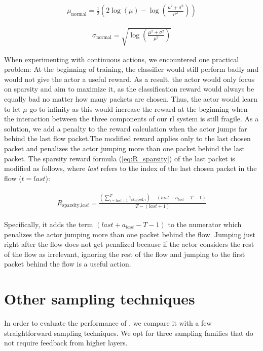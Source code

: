 \documentclass[conference]{IEEEtran}
\begin{document}
\begin{align}
\mu_{\text{normal}} = \frac{1}{2}\left( 2\log(\mu) - \log\left(\frac{\mu^2 + \sigma^2}{\mu^2}\right) \right)
\end{align}

\begin{align}
\sigma_{\text{normal}} = \sqrt{\log\left(\frac{\mu^2 + \sigma^2}{\mu^2}\right)}
\end{align}

When experimenting with continuous actions, we encountered one practical problem: At the beginning of training, the classifier would still perform badly and would not give the actor a useful reward. As a result, the actor would only focus on sparsity and aim to maximize it, as the classification reward would always be equally bad no matter how many packets are chosen. Thus, the actor would learn to let $\mu$ go to infinity as this would increase the reward at the beginning when the interaction between the three components of our \gls{rl} system is still fragile. As a solution, we add a penalty to the reward calculation when the actor jumps far behind the last flow packet.The modified reward applies only to the last chosen packet and penalizes the actor jumping more than one packet behind the last packet. The sparsity reward formula (\autoref{eq:R_sparsity}) of the last packet is modified as follows, where \textit{last} refers to the index of the last chosen packet in the flow ($t=last$):

\begin{align}
\begin{split}
R_{\text{sparsity},\textit{last}} = \frac{\left(\sum_{i=\textit{last}+1}^{T} 1_{\text{skipped},i}\right) - \left(\textit{last}+a_{\textit{last}} - T - 1\right)}{T- (\textit{last}+1)}
\end{split}
\label{eq:R_sparsity_last}
\end{align}

Specifically, it adds the term $\left(\textit{last}+a_{\textit{last}} - T - 1\right)$ to the numerator which penalizes the actor jumping more than one packet behind the flow. Jumping just right after the flow does not get penalized because if the actor considers the rest of the flow as irrelevant, ignoring the rest of the flow and jumping to the first packet behind the flow is a useful action.

\section{Other sampling techniques}
\label{sec:other_sampling_techniques}
In order to evaluate the performance of \ours, we compare it with a few straightforward sampling techniques.
We opt for three sampling families that do not require feedback from higher layers.%
\end{document}
